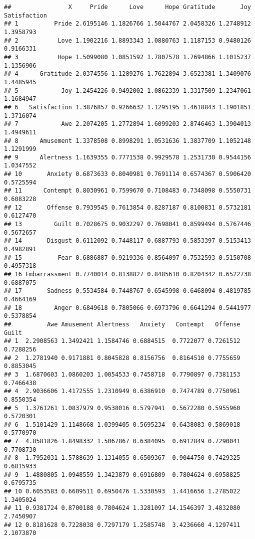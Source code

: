 \documentclass[
]{article}
\begin{document}
\begin{verbatim}
##                X     Pride      Love      Hope Gratitude       Joy Satisfaction
## 1          Pride 2.6195146 1.1826766 1.5044767 2.0458326 1.2748912    1.3958793
## 2           Love 1.1902216 1.8893343 1.0880763 1.1187153 0.9480126    0.9166331
## 3           Hope 1.5099080 1.0851592 1.7807578 1.7694866 1.1015237    1.1356906
## 4      Gratitude 2.0374556 1.1289276 1.7622894 3.6523381 1.3409076    1.4485945
## 5            Joy 1.2454226 0.9492002 1.0862339 1.3317509 1.2347061    1.1684947
## 6   Satisfaction 1.3876857 0.9266632 1.1295195 1.4618843 1.1901851    1.3716074
## 7            Awe 2.2074205 1.2772894 1.6099203 2.8746463 1.3904013    1.4949611
## 8      Amusement 1.3378508 0.8998291 1.0531636 1.3837709 1.1052148    1.1291999
## 9      Alertness 1.1639355 0.7771538 0.9929578 1.2531730 0.9544156    1.0347552
## 10       Anxiety 0.6873633 0.8040981 0.7691114 0.6574367 0.5906420    0.5725594
## 11      Contempt 0.8030961 0.7599670 0.7108483 0.7348098 0.5550731    0.6083228
## 12       Offense 0.7939545 0.7613854 0.8287187 0.8100831 0.5732181    0.6127470
## 13         Guilt 0.7028675 0.9032297 0.7698041 0.8599494 0.5767446    0.5672657
## 14       Disgust 0.6112092 0.7448117 0.6887793 0.5853397 0.5153413    0.4982891
## 15          Fear 0.6886887 0.9219336 0.8564097 0.7532593 0.5150708    0.4957318
## 16 Embarrassment 0.7740014 0.8138827 0.8485610 0.8204342 0.6522738    0.6887075
## 17       Sadness 0.5534584 0.7448767 0.6545998 0.6468094 0.4819785    0.4664169
## 18         Anger 0.6849618 0.7805066 0.6973796 0.6641294 0.5441977    0.5378854
##          Awe Amusement Alertness   Anxiety   Contempt   Offense     Guilt
## 1  2.2908563 1.3492421 1.1584746 0.6884515  0.7722077 0.7261512 0.7288256
## 2  1.2781940 0.9171881 0.8045828 0.8156756  0.8164510 0.7755659 0.8853045
## 3  1.6870603 1.0860203 1.0054533 0.7458718  0.7790897 0.7381153 0.7466438
## 4  2.9036606 1.4172555 1.2310949 0.6386910  0.7474789 0.7750961 0.8550354
## 5  1.3761261 1.0837979 0.9538016 0.5797941  0.5672280 0.5955960 0.5720301
## 6  1.5101429 1.1148668 1.0399405 0.5695234  0.6438083 0.5869018 0.5770970
## 7  4.8581826 1.8498332 1.5067867 0.6384095  0.6912849 0.7290041 0.7708730
## 8  1.7952031 1.5788639 1.1314055 0.6509367  0.9044750 0.7429325 0.6815933
## 9  1.4880805 1.0948559 1.3423879 0.6916809  0.7804624 0.6958825 0.6795735
## 10 0.6053583 0.6609511 0.6950476 1.5330593  1.4416656 1.2785022 1.3405024
## 11 0.9381724 0.8700188 0.7804624 1.3281097 14.1546397 3.4832080 2.7450907
## 12 0.8181628 0.7228038 0.7297179 1.2585748  3.4236660 4.1297411 2.1073870

\end{verbatim}
\end{document}
